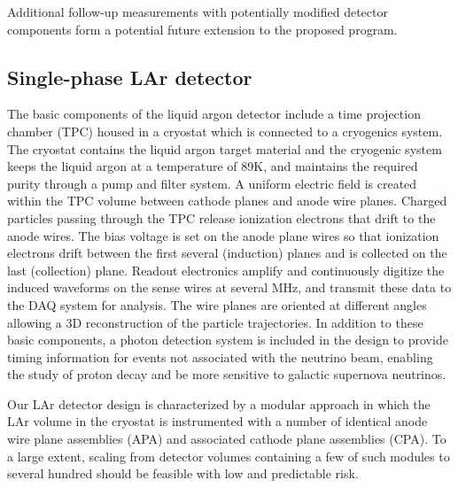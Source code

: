 Additional follow-up measurements with potentially modified detector components form a potential future extension 
to the proposed program.\\


\subsection{Single-phase LAr detector}


The basic components of the liquid argon detector include a time projection chamber (TPC) housed in a cryostat which is connected to  
a cryogenics system. 
%
The cryostat contains the liquid argon target material and the cryogenic system keeps the liquid argon at a temperature of 89K, and maintains the required purity through a pump and filter system. A uniform electric field is created within the TPC volume between cathode planes and anode wire planes. Charged particles passing through the TPC release ionization electrons that drift to the anode wires. The bias voltage is set on the anode plane wires so that ionization electrons drift between the first several (induction) planes and is collected on the last (collection) plane. Readout electronics amplify and continuously digitize the induced waveforms on the sense wires at several MHz, and transmit these data to the DAQ system for analysis. The wire planes are oriented at different angles allowing a 3D reconstruction of the particle trajectories. In addition to these basic components, a photon detection system
is included in the design to provide timing information for events not associated with the neutrino beam, enabling the study of proton decay and be more sensitive to galactic supernova neutrinos.

Our LAr detector design is characterized by a modular approach in which the LAr volume in the cryostat is instrumented with a number of identical anode wire plane assemblies (APA) and associated cathode plane assemblies (CPA). To a large extent, scaling from detector volumes containing a few of such modules  to several hundred should be feasible with low and predictable risk.\\









%






